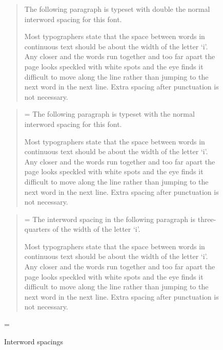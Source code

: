 \documentclass[10pt,a4paper,extrafontsizes]{memoir}
\begin{document}
\setlength{\unitlength}{\fontdimen2\font}
\begin{figure}
\centering
\begin{minipage}{\textwidth}
\mbox{}\hrulefill\mbox{}
\begin{quotation}
\font
    The following paragraph is typeset with double the normal interword 
spacing for this font.

    Most typographers state that the space between words in continuous
text should be about the width of the letter `i'. Any closer and the
words run together and too far apart the page looks speckled with white
spots and the eye finds it difficult to move along the line rather than
jumping to the next word in the next line. 
Extra spacing after punctuation is not necessary.
\end{quotation}
\begin{quotation}
\font=\unitlength
    The following paragraph is typeset with the normal interword spacing 
for this font.

    Most typographers state that the space between words in continuous
text should be about the width of the letter `i'. Any closer and the
words run together and too far apart the page looks speckled with white
spots and the eye finds it difficult to move along the line rather than
jumping to the next word in the next line. 
Extra spacing after punctuation is not necessary.
\end{quotation}
\begin{quotation}
\settowidth{\unitlength}{i}
\setlength{\unitlength}{0.75\unitlength}
\font=\unitlength
    The interword spacing in the following paragraph is three-quarters of
the width of the letter `i'.
 
    Most typographers state that the space between words in continuous
text should be about the width of the letter `i'. Any closer and the
words run together and too far apart the page looks speckled with white
spots and the eye finds it difficult to move along the line rather than
jumping to the next word in the next line. 
Extra spacing after punctuation is not necessary.
\end{quotation}
\mbox{}\hrulefill\mbox{}
\end{minipage}
\font=\unitlength \setlength{\unitlength}{1pt}
\caption{Interword spacings}\label{fig:interword}
\end{figure}
\end{document}
